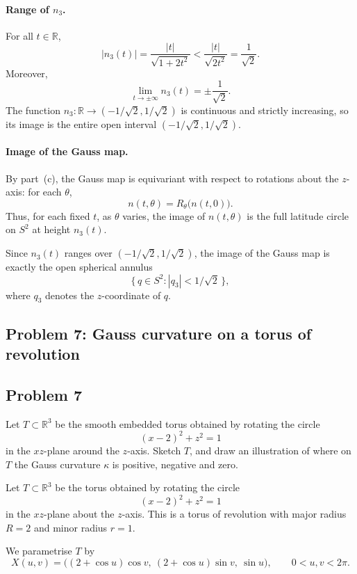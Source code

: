 \documentclass[12pt,a4paper]{article}
\theoremstyle{plain}
\theoremstyle{definition}      %
\begin{document}
\paragraph{Range of $n_3$.}
For all $t\in\mathbb{R}$,
\[
|n_3(t)|
= \frac{|t|}{\sqrt{1+2t^2}}
< \frac{|t|}{\sqrt{2t^2}}
= \frac{1}{\sqrt{2}}.
\]
Moreover,
\[
\lim_{t\to\pm\infty} n_3(t)
= \pm\frac{1}{\sqrt{2}}.
\]
The function $n_3:\mathbb{R}\to(-1/\sqrt{2},1/\sqrt{2})$ is continuous
and strictly increasing, so its image is the entire open interval
$(-1/\sqrt{2},1/\sqrt{2})$.

\paragraph{Image of the Gauss map.}
By part~(c), the Gauss map is equivariant with respect to rotations about
the $z$-axis: for each $\theta$,
\[
n(t,\theta) = R_\theta\bigl(n(t,0)\bigr).
\]
Thus, for each fixed $t$, as $\theta$ varies, the image of $n(t,\theta)$
is the full latitude circle on $S^2$ at height $n_3(t)$.

Since $n_3(t)$ ranges over $(-1/\sqrt{2},1/\sqrt{2})$, the image of the
Gauss map is exactly the open spherical annulus
\[
\{\,q\in S^2 : |q_3|<1/\sqrt{2}\,\},
\]
where $q_3$ denotes the $z$-coordinate of $q$.

\bigskip

\subsection*{Problem 7: Gauss curvature on a torus of revolution}

\subsection*{Problem 7}

Let $T \subset \mathbb{R}^3$ be the smooth embedded torus obtained by rotating
the circle
\[
(x-2)^2 + z^2 = 1
\]
in the $xz$-plane around the $z$-axis. Sketch $T$, and draw an illustration of
where on $T$ the Gauss curvature $\kappa$ is positive, negative and zero.


Let $T\subset\mathbb{R}^3$ be the torus obtained by rotating the circle
\[
(x-2)^2 + z^2 = 1
\]
in the $xz$-plane about the $z$-axis. This is a torus of revolution with
major radius $R=2$ and minor radius $r=1$.

We parametrise $T$ by
\[
X(u,v) = \bigl((2+\cos u)\cos v,\ (2+\cos u)\sin v,\ \sin u\bigr),
\qquad 0<u,v<2\pi.
\]
\end{document}
